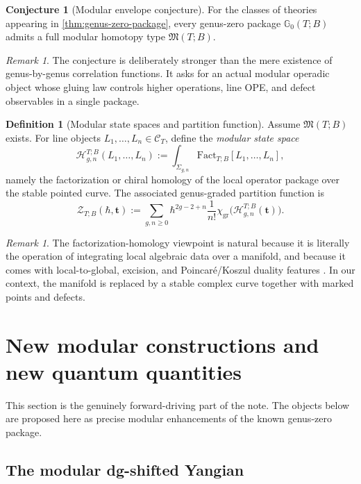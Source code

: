 \documentclass[11pt]{article}
\theoremstyle{definition}
\newtheorem{definition}[theorem]{Definition}
\newtheorem{conjecture}[theorem]{Conjecture}
\theoremstyle{remark}
\newtheorem{remark}[theorem]{Remark}
\newcommand{\C}{\mathcal C}
\newcommand{\G}{\mathbb G}
\newcommand{\Hh}{\mathcal H}
\newcommand{\ModEnv}{\mathfrak M}
\newcommand{\gr}{\mathrm{gr}}
\newcommand{\Fact}{\mathrm{Fact}}
\begin{document}
\begin{conjecture}[Modular envelope conjecture]\label{conj:modular-envelope}
For the classes of theories appearing in \cref{thm:genus-zero-package}, every genus-zero package $\G_0(T;B)$ admits a full modular homotopy type $\ModEnv(T;B)$.
\end{conjecture}

\begin{remark}
The conjecture is deliberately stronger than the mere existence of genus-by-genus correlation functions. It asks for an actual modular operadic object whose gluing law controls higher operations, line OPE, and defect observables in a single package.
\end{remark}

\begin{definition}[Modular state spaces and partition function]\label{def:state-spaces}
Assume $\ModEnv(T;B)$ exists. For line objects $L_1,\dots,L_n\in\C_T$, define the \emph{modular state space}
\[
\Hh_{g,n}^{T;B}(L_1,\dots,L_n)
:=
\int_{\Sigma_{g,n}} \Fact_{T;B}[L_1,\dots,L_n],
\]
namely the factorization or chiral homology of the local operator package over the stable pointed curve. The associated genus-graded partition function is
\[
\mathcal Z_{T;B}(\hbar,\mathbf t)
:=
\sum_{g,n\ge 0}
\hbar^{2g-2+n}\frac{1}{n!}
\chi_{\gr}\bigl(\Hh_{g,n}^{T;B}(\mathbf t)\bigr).
\]
\end{definition}

\begin{remark}
The factorization-homology viewpoint is natural because it is literally the operation of integrating local algebraic data over a manifold, and because it comes with local-to-global, excision, and Poincar\'e/Koszul duality features \cite{AF2015,AF2019,AFPrimer,BD2004,BrochierWoike2022}. In our context, the manifold is replaced by a stable complex curve together with marked points and defects.
\end{remark}

\section{New modular constructions and new quantum quantities}\label{sec:new-objects}

This section is the genuinely forward-driving part of the note. The objects below are proposed here as precise modular enhancements of the known genus-zero package.

\subsection{The modular dg-shifted Yangian}
\end{document}
